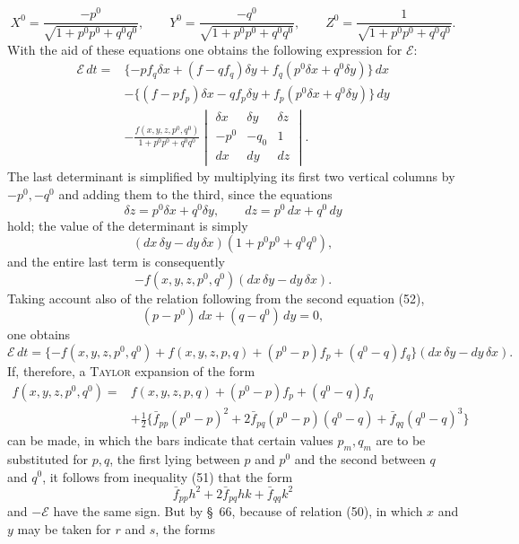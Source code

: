\documentclass[11pt,a4paper,leqno]{article}
\begin{document}
\[
X^0=\frac{-p^0}{\sqrt{1+p^0p^0+q^0q^0}},\qquad
Y^0=\frac{-q^0}{\sqrt{1+p^0p^0+q^0q^0}},\qquad
Z^0=\frac{1}{\sqrt{1+p^0p^0+q^0q^0}}.
\]
With the aid of these equations one obtains the following expression for
$\mathcal{E}$:
\[
\begin{aligned}
\mathcal{E}\,dt={}&
\{-pf_q\delta x+(f-qf_q)\delta y+f_q(p^0\delta x+q^0\delta y)\}\,dx\\
&-\{(f-pf_p)\delta x-qf_p\delta y+f_p(p^0\delta x+q^0\delta y)\}\,dy\\
&-\frac{f(x,y,z,p^0,q^0)}{1+p^0p^0+q^0q^0}
\begin{vmatrix}
\delta x&\delta y&\delta z\\ -p^0&-q_0&1\\ dx&dy&dz
\end{vmatrix}.
\end{aligned}
\]
The last determinant is simplified by multiplying its first two vertical
columns by $-p^0,-q^0$ and adding them to the third, since the equations
\begin{equation}\tag{52}
\delta z=p^0\delta x+q^0\delta y,\qquad dz=p^0\,dx+q^0\,dy
\end{equation}
hold; the value of the determinant is simply
\[
(dx\,\delta y-dy\,\delta x)(1+p^0p^0+q^0q^0),
\]
and the entire last term is consequently
\[
-f(x,y,z,p^0,q^0)(dx\,\delta y-dy\,\delta x).
\]
Taking account also of the relation following from the second equation (52),
\[
(p-p^0)\,dx+(q-q^0)\,dy=0,
\]
one obtains
\[
\mathcal{E}\,dt=\{-f(x,y,z,p^0,q^0)+f(x,y,z,p,q)
+(p^0-p)f_p+(q^0-q)f_q\}(dx\,\delta y-dy\,\delta x).
\]
If, therefore, a \textsc{Taylor} expansion of the form
\[
\begin{aligned}
f(x,y,z,p^0,q^0)={}&f(x,y,z,p,q)+(p^0-p)f_p+(q^0-q)f_q\\
&+\frac12\{\bar f_{pp}(p^0-p)^2
+2\bar f_{pq}(p^0-p)(q^0-q)+\bar f_{qq}(q^0-q)^3\}
\end{aligned}
\]
can be made, in which the bars indicate that certain values $p_m,q_m$ are to
be substituted for $p,q$, the first lying between $p$ and $p^0$ and the
second between $q$ and $q^0$, it follows from inequality (51) that the form
\[
\bar f_{pp}h^2+2\bar f_{pq}hk+\bar f_{qq}k^2
\]
and $-\mathcal{E}$ have the same sign.
But by \S~66, because of relation (50), in which $x$ and $y$ may be taken for
$r$ and $s$, the forms
\end{document}
